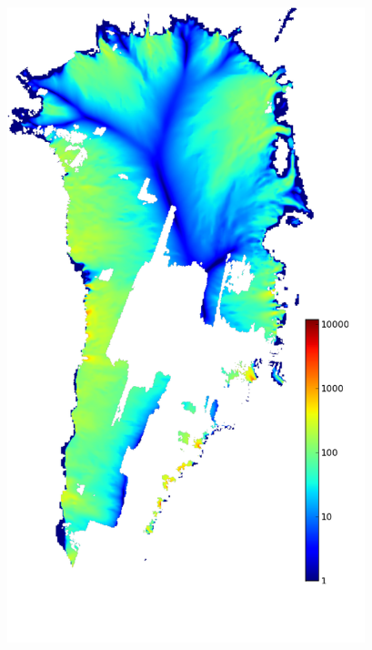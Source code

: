 \documentclass{beamer}
\begin{document}
\begin{frame}
\begin{columns}
\begin{column}{0.33\textwidth}
\begin{center}
\end{center}
\end{column}
\begin{column}{0.33\textwidth}
\begin{center}
  \includegraphics[width=0.85\textwidth]{g3km_3_25_98}
\end{center}
\end{column}
\begin{column}{0.33\textwidth}
\begin{center}

\end{center}
\end{column}
\end{columns}
\end{frame}
\end{document}
